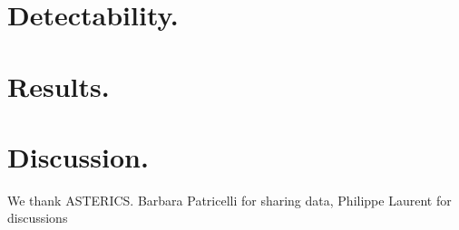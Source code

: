 \documentclass[a0,portrait]{a0poster}
\begin{document}
\begin{multicols}{2}
\section*{Detectability.}

\section*{Results.}


\section*{Discussion.}



\cite{*}


\vspace{10mm}

{\footnotesize 
  We thank ASTERICS. Barbara Patricelli for sharing data, Philippe Laurent for discussions}




\end{multicols}
\end{document}
